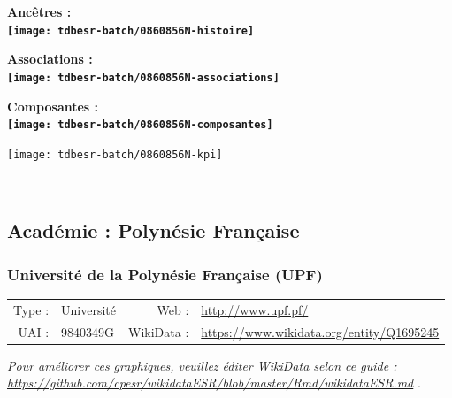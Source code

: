 \documentclass[12pt,french,]{article}
\begin{document}
\vspace{1cm}  
\begin{minipage}[b]{0.50\textwidth}\begin{center} \bf Ancêtres : \\  
\texttt{[image: tdbesr-batch/0860856N-histoire]} \end{center}\end{minipage}\begin{minipage}[b]{0.50\textwidth}\begin{center} \bf Associations : \\  
\texttt{[image: tdbesr-batch/0860856N-associations]} \end{center}\end{minipage}

\hrulefill

\begin{center} \bf Composantes : \\  
\texttt{[image: tdbesr-batch/0860856N-composantes]} \end{center}

\begin{center}\texttt{[image: tdbesr-batch/0860856N-kpi]} \end{center}\checkoddpage

\ifoddpage \fi ~\newpage  

\hypertarget{acaduxe9mie-polynuxe9sie-franuxe7aise}{%
\subsection{Académie : Polynésie
Française}\label{acaduxe9mie-polynuxe9sie-franuxe7aise}}

\hypertarget{universituxe9-de-la-polynuxe9sie-franuxe7aise-upf}{%
\subsubsection{Université de la Polynésie Française
(UPF)}\label{universituxe9-de-la-polynuxe9sie-franuxe7aise-upf}}

\begin{tabular*}{\textwidth}{rp{5cm}rl}  
\hline  
Type : & Université & Web : &\href{http://www.upf.pf/}{http://www.upf.pf/} \\  
UAI : & 9840349G & WikiData : & \href{https://www.wikidata.org/entity/Q1695245}{https://www.wikidata.org/entity/Q1695245} \\  
\hline  
\end{tabular*}

\textit{\scriptsize Pour améliorer ces graphiques, veuillez éditer WikiData selon ce guide :  \href{https://github.com/cpesr/wikidataESR/blob/master/Rmd/wikidataESR.md}{https://github.com/cpesr/wikidataESR/blob/master/Rmd/wikidataESR.md}}
.
\end{document}
